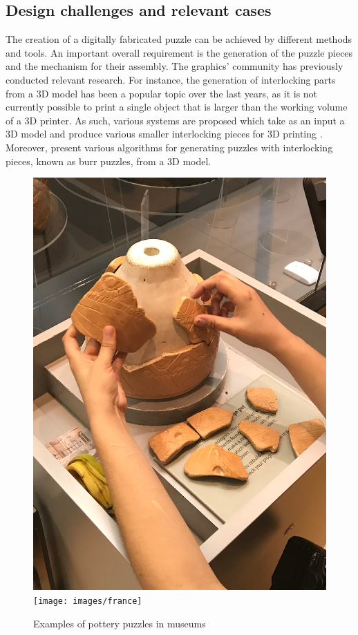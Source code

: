 \documentclass[acmlarge,screen,dvipsnames]{acmart}
\begin{document}
\subsection{Design challenges and relevant cases}
 
%
The creation of a digitally fabricated puzzle can be achieved by
different methods and tools. An important overall requirement is the
generation of the puzzle pieces and the mechanism for their
assembly. The graphics' community has previously conducted relevant
research. For instance, the generation of interlocking parts from a 3D
model has been a popular topic over the last years, as it is not
currently possible to print a single object that is larger than the
working volume of a 3D printer. As such, various systems are proposed
which take as an input a 3D model and produce various smaller
interlocking pieces for 3D printing
\cite{Song:2015:POI:2797416.2797510,luo_chopper:_2012,klein_interlocking_2014,skouras_interactive_2015}. Moreover,
\cite{Xin:2011:MBP:2010324.1964992,Song:2012:RIP:2366145.2366147,sun_computational_2015}
present various algorithms for generating puzzles with interlocking
pieces, known as burr puzzles, from a 3D model.
%
\begin{figure}[b]
  \centering
  {\includegraphics[width=0.35\linewidth]{images/uk}}
  \hspace{0.5in}
  {\texttt{[image: images/france]}}
  \caption{\label{fig:puz}Examples of pottery puzzles in museums}
\end{figure}
\end{document}
